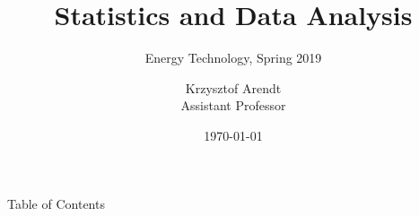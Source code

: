 \documentclass{beamer}%
\title{Statistics and Data Analysis}
\subtitle{Energy Technology, Spring 2019}
\date{\today}
\author{Krzysztof Arendt\\
        Assistant Professor}
\institute{Center for Energy Informatics,\\University of Southern Denmark}
\begin{document}
\maketitle

\begin{frame}{Table of Contents}
\tableofcontents
\end{frame}


%
\end{document}
